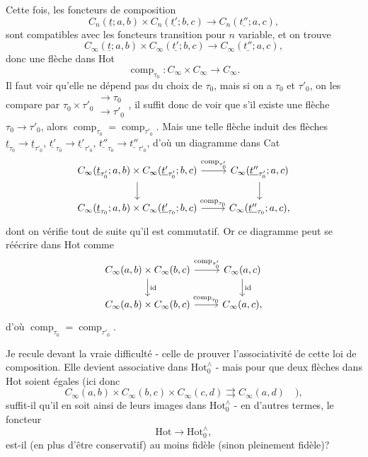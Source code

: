 \documentclass[11pt]{article}
\newcommand{\msp}[1]{\marginpar{\footnotesize [#1]}}
\newcommand{\Hot}{\mathrm{Hot}}
\newcommand{\comp}{\operatorname{comp}}
\begin{document}
Cette fois, les foncteurs de composition
\[ C_n(\underline{t};a,b)\times C_n(\underline{t'};b,c) \longrightarrow C_n(\underline{t''};a,c), \]
sont compatibles avec les foncteurs transition pour $n$ variable, et on trouve
\msp{page 126}
\[ C_\infty(\underline{t};a,b)\times C_\infty(\underline{t'};b,c) \longrightarrow C_\infty(\underline{t''};a,c), \]
donc une flèche dans Hot
\[ \comp_{\tau_0} : C_\infty\times C_\infty \longrightarrow C_\infty. \]
Il faut voir qu'elle ne dépend pas du choix de $\tau_0$, mais si on a $\tau_0$ et $\tau'_0$, on les compare par $\tau_0\times\tau'_0 \begin{array}{l}\longrightarrow \tau_0\\ \longrightarrow \tau'_0\end{array}$, il suffit donc de voir que s'il existe une flèche $\tau_0\longrightarrow\tau'_0$, alors $\comp_{\tau_0} = \comp_{\tau'_0}$. Mais une telle flèche induit des flèches $\underline{t}_{\tau_0}\longrightarrow\underline{t}_{\tau'_0}$, $\underline{t'}_{\tau_0}\longrightarrow\underline{t'}_{\tau'_0}$, $\underline{t''}_{\tau_0}\longrightarrow\underline{t''}_{\tau'_0}$, d'où un diagramme dans Cat
\[
\begin{tikzcd}
C_\infty(\underline{t}_{\tau'_0};a,b)\times C_\infty(\underline{t'}_{\tau'_0};b,c) \arrow[r, "{\comp_{\tau'_0}}"] \arrow[d] & C_\infty(\underline{t''}_{\tau'_0};a,c) \arrow[d] \\
C_\infty(\underline{t}_{\tau_0};a,b)\times C_\infty(\underline{t'}_{\tau_0};b,c) \arrow[r, "{\comp_{\tau_0}}"] & C_\infty(\underline{t''}_{\tau_0};a,c),
\end{tikzcd}
\]
dont on vérifie tout de suite qu'il est commutatif. Or ce diagramme peut se réécrire dans Hot comme
\[
\begin{tikzcd}
C_\infty(a,b)\times C_\infty(b,c) \arrow[r, "{\comp_{\tau'_0}}"] \arrow[d, "{\mathrm{id}}"] & C_\infty(a,c) \arrow[d, "{\mathrm{id}}"] \\
C_\infty(a,b)\times C_\infty(b,c) \arrow[r, "{\comp_{\tau_0}}"] & C_\infty(a,c),
\end{tikzcd}
\]
\msp{page 127}
d'où $\comp_{\tau_0} = \comp_{\tau'_0}$.

Je recule devant la vraie difficulté - celle de prouver l'associativité de cette loi de composition. Elle devient associative dans $\Hot^{\wedge}_{0}$ - mais pour que deux flèches dans Hot soient égales (ici donc
\[ C_\infty(a,b)\times C_\infty(b,c)\times C_\infty(c,d) \rightrightarrows C_\infty(a,d)\quad ), \]
suffit-il qu'il en soit ainsi de leurs images dans $\Hot^{\wedge}_{0}$ - en d'autres termes, le foncteur
\[ \Hot\longrightarrow\Hot^{\wedge}_{0}, \]
est-il (en plus d'être conservatif) au moins fidèle (sinon pleinement fidèle)?
\end{document}
